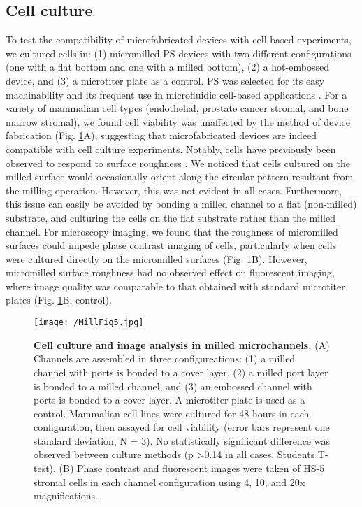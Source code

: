 \subsection{Cell culture}
To test the compatibility of microfabricated devices with cell based experiments, we cultured cells in: (1) micromilled PS devices with two different configurations (one with a flat bottom and one with a milled bottom), (2) a hot-embossed device, and (3) a microtiter plate as a control. PS was selected for its easy machinability and its frequent use in microfluidic cell-based applications \cite{Berthier2012, Berthier2013}. For a variety of mammalian cell types (endothelial, prostate cancer stromal, and bone marrow stromal), we found cell viability was unaffected by the method of device fabrication (Fig. \ref{figure:MillFig5}A), suggesting that microfabricated devices are indeed compatible with cell culture experiments. Notably, cells have previously been observed to respond to surface roughness \cite{Anselme2010, Kieswetter1996, Hatano1999, Deligianni2001, Xu2004, Mustafa2005, Anselme2010, Dowling2011, Gittens2011}. We noticed that cells cultured on the milled surface would occasionally orient along the circular pattern resultant from the milling operation. However, this was not evident in all cases. Furthermore, this issue can easily be avoided by bonding a milled channel to a flat (non-milled) substrate, and culturing the cells on the flat substrate rather than the milled channel. For microscopy imaging, we found that the roughness of micromilled surfaces could impede phase contrast imaging of cells, particularly when cells were cultured directly on the micromilled surfaces (Fig. \ref{figure:MillFig5}B). However, micromilled surface roughness had no observed effect on fluorescent imaging, where image quality was comparable to that obtained with standard microtiter plates (Fig. \ref{figure:MillFig5}B, control).

\begin{figure}[h!] %
\centering
\texttt{[image: /MillFig5.jpg]}
\caption{\textbf{Cell culture and image analysis in milled microchannels.} (A) Channels are assembled in three configureations: (1) a milled channel with ports is bonded to a cover layer, (2) a milled port layer is bonded to a milled channel, and (3) an embossed channel with ports is bonded to a cover layer. A microtiter plate is used as a control. Mammalian cell lines were cultured for 48 hours in each configuration, then assayed for cell viability (error bars represent one standard deviation, N = 3). No statistically significant difference was observed between culture methods (p \textgreater 0.14 in all cases, Students T-test). (B) Phase contrast and fluorescent images were taken of HS-5 stromal cells in each channel configuration using 4, 10, and 20x magnifications.}
\label{figure:MillFig5}
\end{figure}


